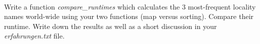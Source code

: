  \\
Write a function \textit{compare\_runtimes} which calculates the 3 
most-frequent locality names world-wide using your two functions (map versus sorting). Compare their runtime. Write down the results as well as a short discussion in your
\textit{erfahrungen.txt} file.

